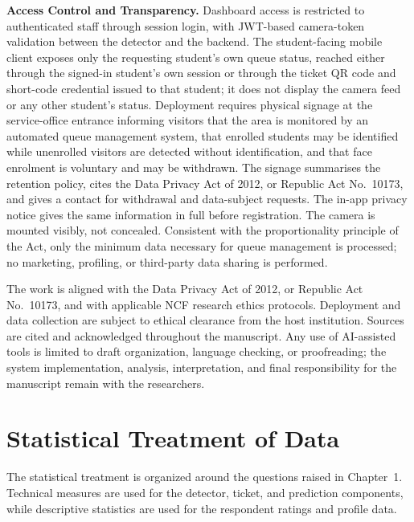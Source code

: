 \documentclass{research}
\begin{document}
\textbf{Access Control and Transparency.} Dashboard access is
restricted to authenticated staff through session login, with JWT-based
camera-token validation between the detector and the backend. The
student-facing mobile client exposes only the requesting student's own
queue status, reached either through the signed-in student's own session
or through the ticket QR code and short-code credential issued to that
student; it does not display the camera feed or any other student's
status. Deployment requires physical signage at the service-office
entrance informing visitors that the area is monitored by an automated
queue management system, that enrolled students may be identified while
unenrolled visitors are detected without identification, and that face
enrolment is voluntary and may be withdrawn. The signage summarises the
retention policy, cites the Data Privacy Act of 2012, or Republic Act
No.~10173, and gives a contact for withdrawal and data-subject requests.
The in-app privacy notice gives the same information in full before
registration. The camera is
mounted visibly, not concealed. Consistent with the proportionality
principle of the Act, only the minimum data necessary for queue
management is processed; no marketing, profiling, or third-party data
sharing is performed.

The work is aligned with the Data Privacy Act of 2012, or Republic Act
No.~10173, and with applicable NCF research ethics protocols.
Deployment and data collection are subject to ethical clearance from
the host institution. Sources are cited and acknowledged
throughout the manuscript. Any use of AI-assisted tools is limited to
draft organization, language checking, or proofreading; the system
implementation, analysis, interpretation, and final responsibility for
the manuscript remain with the researchers.

\section{Statistical Treatment of Data}

The statistical treatment is organized around the questions raised in
Chapter~1. Technical measures are used for the detector, ticket, and
prediction components, while descriptive statistics are used for the
respondent ratings and profile data.
\end{document}
